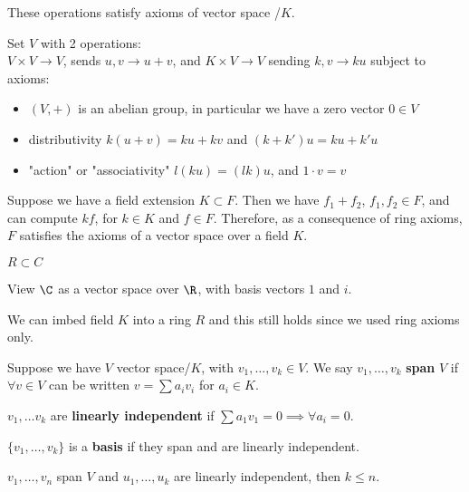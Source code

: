 \documentclass[twoside, 10pt]{article}
\begin{document}
These operations satisfy axioms of vector space /$K$. 

Set $V$ with 2 operations: \\
$V\times V \to V$, sends $u, v \to u + v$, and $K \times V \to V$ sending $k, v \to ku$ subject to axioms:
\begin{itemize}
    \item $(V, +)$ is an abelian group, in particular we have a zero vector $0 \in V$
    \item distributivity $k(u + v) = ku + kv$ and $(k + k')u = ku + k'u$
    \item "action" or "associativity" $l(ku) = (lk)u$, and $1 \cdot v = v$
\end{itemize}

\begin{exm*}
    Suppose we have a field extension $K \subset F$. Then we have $f_1 + f_2$, $f_1, f_2 \in F$, and can compute $kf$, for $k \in K$ and $f\in F$. Therefore, as a consequence of ring axioms, $F$ satisfies the axioms of a vector space over a field $K$. 
\end{exm*}

\begin{exm*}
    $R \subset C$
\end{exm*}
View $\C$ as a vector space over $\R$, with basis vectors $1$ and $i$.

\begin{rmk}
    We can imbed field $K$ into a ring $R$ and this still holds since we used ring axioms only.
\end{rmk}

\begin{defn}
    Suppose we have $V$ vector space/$K$, with $v_1, \ldots, v_k \in V$. We say $v_1, \ldots, v_k$ \textbf{span} $V$ if $\forall v \in V$ can be written $v = \sum a_iv_i$ for $a_i \in K$.
\end{defn}

\begin{defn}
    $v_1, \ldots v_k$ are \textbf{linearly independent} if $\sum a_1 v_1 = 0 \implies \forall a_i = 0$.
\end{defn}

\begin{defn}
    $\{v_1, \ldots, v_k\}$ is a \textbf{basis} if they span and are linearly independent.
\end{defn}

\begin{lem}
    $v_1, \ldots, v_n$ span $V$ and $u_1, \ldots, u_k$ are linearly independent, then $k \leq n$.
\end{lem}
\end{document}
